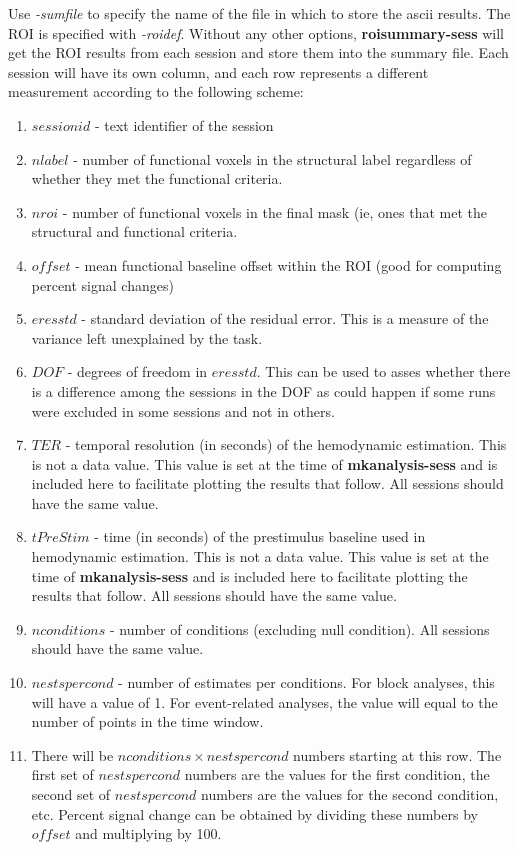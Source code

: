 \documentclass[10pt]{article}
\begin{document}
Use {\em -sumfile} to specify the name of the file in which to store
the ascii results.  The ROI is specified with {\em -roidef}.  Without
any other options, {\bf roisummary-sess} will get the ROI results from
each session and store them into the summary file. Each session will
have its own column, and each row represents a different measurement
according to the following scheme:

\begin{enumerate}
\item $session id$ - text identifier of the session
\item $nlabel$ - number of functional voxels in the structural label
regardless of whether they met the functional criteria.
\item $nroi$ -  number of functional voxels in the final mask (ie,
ones that met the structural and functional criteria.
\item $offset$ - mean functional baseline offset within the ROI (good for
computing percent signal changes)
\item $eresstd$ - standard deviation of the residual error. This is
a measure of the variance left unexplained by the task.
\item $DOF$ - degrees of freedom in $eresstd$. This can be used to
asses whether there is a difference among the sessions in the DOF as
could happen if some runs were excluded in some sessions and not in
others. 
\item $TER$ - temporal resolution (in seconds) of the hemodynamic
estimation.  This is not a data value. This value is set at the time
of {\bf mkanalysis-sess} and is included here to facilitate plotting
the results that follow. All sessions should have the same value.
\item $tPreStim$ - time (in seconds) of the prestimulus baseline used
in hemodynamic estimation.  This is not a data value. This value is
set at the time of {\bf mkanalysis-sess} and is included here to
facilitate plotting the results that follow. All sessions should have
the same value.
\item $nconditions$ - number of conditions (excluding null
condition). All sessions should have the same value.
\item $nestspercond$ - number of estimates per conditions. For block
analyses, this will have a value of 1. For event-related analyses, the
value will equal to the number of points in the time window.
\item There will be $nconditions \times nestspercond$ numbers starting
at this row.  The first set of $nestspercond$ numbers are the values for the
first condition, the second set of $nestspercond$ numbers are the
values for the second condition, etc.  Percent signal change can be
obtained by dividing these numbers by $offset$ and multiplying by 100.
\end{enumerate}
\end{document}
